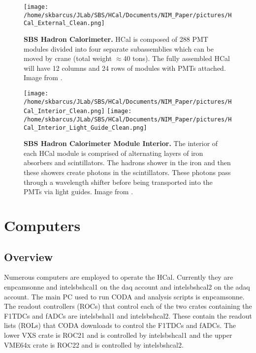 \documentclass[oneside]{book}   %
\begin{document}
	\begin{figure}[!ht]
	\begin{center}
	\texttt{[image: /home/skbarcus/JLab/SBS/HCal/Documents/NIM\_Paper/pictures/HCal\_External\_Clean.png]}
	\end{center}
	\caption{
	{\bf{SBS Hadron Calorimeter.}} HCal is composed of 288 PMT modules divided into four separate subassemblies which can be moved by crane (total weight $\approx$40 tons). The fully assembled HCal will have 12 columns and 24 rows of modules with PMTs attached. Image from \cite{brio_2018}.}
	\label{fig:HCal}
	\end{figure}	
	
	\begin{figure}[!ht]
	\begin{center}
	\texttt{[image: /home/skbarcus/JLab/SBS/HCal/Documents/NIM\_Paper/pictures/HCal\_Interior\_Clean.png]}
	\texttt{[image: /home/skbarcus/JLab/SBS/HCal/Documents/NIM\_Paper/pictures/HCal\_Interior\_Light\_Guide\_Clean.png]}
	\end{center}
	\caption{
	{\bf{SBS Hadron Calorimeter Module Interior.}} The interior of each HCal module is comprised of alternating layers of iron absorbers and scintillators. The hadrons shower in the iron and then these showers create photons in the scintillators. These photons pass through a wavelength shifter before being transported into the PMTs via light guides. Image from \cite{brio_2018}.}
	\label{fig:HCal_interior}
	\end{figure}	


\chapter{Computers}
\label{ch:computers}
\section{Overview}
\label{sec:computers_overview}

Numerous computers are employed to operate the HCal. Currently they are enpcamsonne and intelsbshcal1 on the daq account and intelsbshcal2 on the adaq account. The main PC used to run CODA and analysis scripts is enpcamsonne. The readout controllers (ROCs) that control each of the two crates containing the F1TDCs and fADCs are intelsbshal1 and intelsbshcal2. These contain the readout lists (ROLs) that CODA downloads to control the F1TDCs and fADCs. The lower VXS crate is ROC21 and is controlled by intelsbshcal1 and the upper VME64x crate is ROC22 and is controlled by intelsbshcal2.\\
\end{document}
